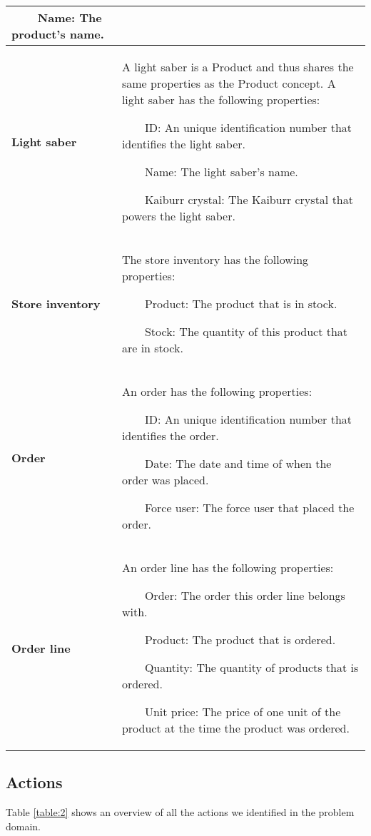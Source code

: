 \documentclass[a4paper]{article}
\newcommand{\tabitem}{~~\llap{\textbullet}~~}
\begin{document}
\begin{table}
\begin{tabular}{|p{3cm}|p{8.5cm}|}
			\tabitem Name: The product's name.\\ \hline
		
		\textbf{Light saber} & A light saber is a Product and thus shares the same properties as the Product concept. A light saber has the following properties:	
			
			\tabitem ID: An unique identification number that identifies the light saber.
			
			\tabitem Name: The light saber's name.
			
			\tabitem Kaiburr crystal: The Kaiburr crystal that powers the light saber.\\ \hline
		
		\textbf{Store inventory} & The store inventory has the following properties: 
		
			\tabitem Product: The product that is in stock.
			
			\tabitem Stock: The quantity of this product that are in stock. \\ \hline
			
		\textbf{Order} & An order has the following properties:
		
			\tabitem ID: An unique identification number that identifies the order.
		
			\tabitem Date: The date and time of when the order was placed.
			
			\tabitem Force user: The force user that placed the order.\\ \hline
		
		\textbf{Order line} & An order line has the following properties:
		
			\tabitem Order: The order this order line belongs with.
			
			\tabitem Product: The product that is ordered.
			
			\tabitem Quantity: The quantity of products that is ordered.
			
			\tabitem Unit price: The price of one unit of the product at the time the product was ordered.\\ \hline		
	\end{tabular}
\end{table}

\subsection{Actions}
Table \ref{table:2} shows an overview of all the actions we identified in the problem domain. 
\end{document}
